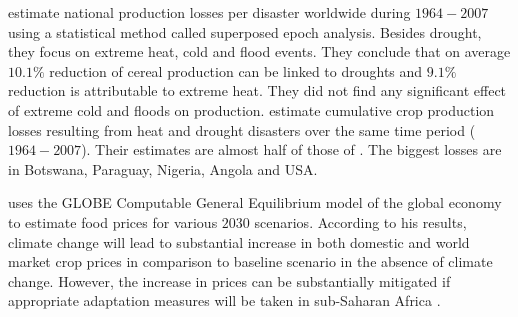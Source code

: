 \documentclass[a4paper,12pt]{article}
\begin{document}
\cite{Pedram2016} estimate national production losses per disaster worldwide during ${1964-2007}$ using a statistical method called superposed epoch analysis. Besides drought, they focus on extreme heat, cold and flood events. They conclude that on average $10.1\%$ reduction of cereal production can be linked to droughts and $9.1\%$ reduction is attributable to extreme heat. They did not find any significant effect of extreme cold and floods on production. \cite{Mehrabi2017} estimate cumulative crop production losses resulting from heat and drought disasters over the same time period (${1964-2007}$). Their estimates are almost half of those of \cite{Pedram2016}. The biggest losses are in Botswana, Paraguay, Nigeria, Angola and USA.

\cite{OxfamIDS} uses the GLOBE Computable General Equilibrium model of the global economy to estimate food prices for various $2030$ scenarios. According to his results, climate change will lead to substantial increase in both domestic and world market crop prices in comparison to baseline scenario in the absence of climate change. However, the increase in prices can be substantially mitigated if appropriate adaptation measures will be taken in sub-Saharan Africa \citep{OxfamIDS}.



\end{document}
